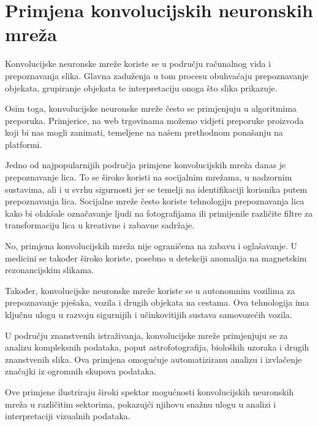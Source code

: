 
\chapter{Primjena konvolucijskih neuronskih mreža}\label{ch:primjena-konvolucijskih-neuronskih-mreza}

Konvolucijske neuronske mreže koriste se u području računalnog vida i prepoznavanja slika.
Glavna zaduženja u tom procesu obuhvaćaju prepoznavanje objekata, grupiranje objekata te interpretaciju onoga što slika prikazuje.

Osim toga, konvolucijske neuronske mreže često se primjenjuju u algoritmima preporuka.
Primjerice, na web trgovinama možemo vidjeti preporuke proizvoda koji bi nas mogli zanimati, temeljene na našem prethodnom ponašanju na platformi.

Jedno od najpopularnijih područja primjene konvolucijskih mreža danas je prepoznavanje lica.
To se široko koristi na socijalnim mrežama, u nadzornim sustavima, ali i u svrhu sigurnosti jer se temelji na identifikaciji korisnika putem prepoznavanja lica.
Socijalne mreže često koriste tehnologiju prepoznavanja lica kako bi olakšale označavanje ljudi na fotografijama ili primijenile različite filtre za transformaciju lica u kreativne i zabavne sadržaje.

No, primjena konvolucijskih mreža nije ograničena na zabavu i oglašavanje.
U medicini se također široko koriste, posebno u detekciji anomalija na magnetskim rezonancijskim slikama.

Također, konvolucijske neuronske mreže koriste se u autonomnim vozilima za prepoznavanje pješaka, vozila i drugih objekata na cestama.
Ova tehnologija ima ključnu ulogu u razvoju sigurnijih i učinkovitijih sustava samovozećih vozila.

U području znanstvenih istraživanja, konvolucijske mreže primjenjuju se za analizu kompleksnih podataka, poput astrofotografija, bioloških uzoraka i drugih znanstvenih slika.
Ova primjena omogućuje automatiziranu analizu i izvlačenje značajki iz ogromnih skupova podataka.

Ove primjene ilustriraju široki spektar mogućnosti konvolucijskih neuronskih mreža u različitim sektorima, pokazujći njihovu snažnu ulogu u analizi i interpretaciji vizualnih podataka.